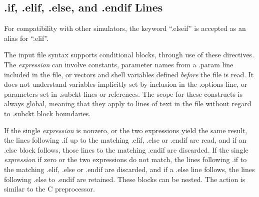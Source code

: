 \subsection{{\vt .if}, {\vt .elif}, {\vt .else}, and {\vt .endif} Lines}

For compatibility with other simulators, the keyword ``{\vt .elseif}''
is accepted as an alias for ``{\vt .elif}''.

The {\WRspice} input file syntax supports conditional blocks, through
use of these directives.  The {\it expression} can involve constants,
parameter names from a {\vt .param} line included in the file, or
vectors and shell variables defined {\it before} the file is read.  It
does not understand variables implicitly set by inclusion in the {\vt
.options} line, or parameters set in {\vt .subckt} lines or
references.  The scope for these constructs is always global, meaning
that they apply to lines of text in the file without regard to {\vt
.subckt} block boundaries.

If the single {\it expression} is nonzero, or the two expressions
yield the same result, the lines following {\vt .if} up to the
matching {\vt .elif}, {\vt .else} or {\vt .endif} are read, and if an
{\vt .else} block follows, those lines to the matching {\vt .endif}
are discarded.  If the single {\it expression} if zero or the two
expressions do not match, the lines following {\vt .if} to the
matching {\vt .elif}, {\vt .else} or {\vt .endif} are discarded, and
if a {\vt .else} line follows, the lines following {\vt .else} to {\vt
.endif} are retained.  These blocks can be nested.  The action is
similar to the C preprocessor.

